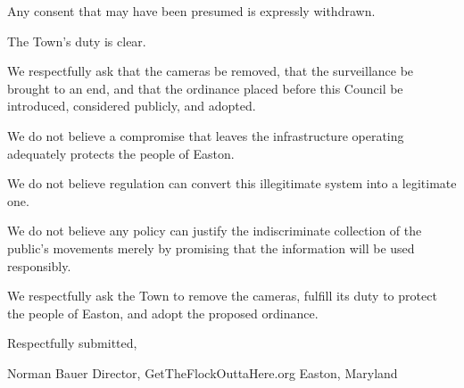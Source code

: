 \documentclass[11pt]{article}
\begin{document}
Any consent that may have been presumed is expressly withdrawn.

The Town’s duty is clear.

We respectfully ask that the cameras be removed, that the surveillance be brought to an end, and that the ordinance placed before this Council be introduced, considered publicly, and adopted.

We do not believe a compromise that leaves the infrastructure operating adequately protects the people of Easton.

We do not believe regulation can convert this illegitimate system into a legitimate one.

We do not believe any policy can justify the indiscriminate collection of the public’s movements merely by promising that the information will be used responsibly.

We respectfully ask the Town to remove the cameras, fulfill its duty to protect the people of Easton, and adopt the proposed ordinance.

Respectfully submitted,

Norman Bauer
Director, GetTheFlockOuttaHere.org
Easton, Maryland
\end{document}
